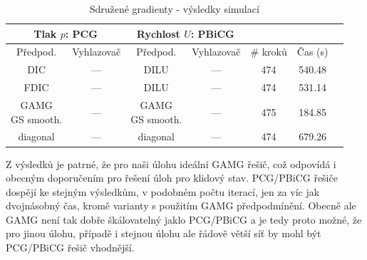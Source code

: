 \documentclass[a4paper,12pt]{report}
\theoremstyle{remark}
\begin{document}
\begin{table}[H]
\centering
\caption{Sdružené gradienty - výsledky simulací}
\renewcommand{\arraystretch}{1.9}
\begin{tabular}{*7c}
\toprule	
\multicolumn{2}{c}{Tlak $p$: \textbf{PCG}} & \multicolumn{2}{c}{Rychlost $U$: \textbf{PBiCG}}\\
	\midrule
	Předpod.&Vyhlazovač&Předpod.&Vyhlazovač&\# kroků&Čas (s)\\
	\midrule
	 DIC & --- &  DILU & --- &474&540.48\\
	FDIC & --- &  DILU & --- &474&531.14\\	
	 \shortstack{GAMG\\GS smooth.}& --- &  \shortstack{GAMG\\GS smooth.}& --- &475&184.85\\
	diagonal & --- & diagonal & ---&474&679.26\\	
	\bottomrule
\end{tabular}
\label{table:solvers_PCG}
\end{table}
Z výsledků je patrné, že pro naši úlohu ideální GAMG řešič, což odpovídá i obecným doporučením pro řešení úloh pro klidový stav. PCG/PBiCG řešiče dospějí ke stejným výsledkům, v podobném počtu iterací, jen za víc jak dvojnásobný čas, kromě varianty s použitím GAMG předpodmínění. Obecně ale GAMG není tak dobře škálovatelný jaklo PCG/PBiCG a je tedy proto možné, že pro jinou úlohu, případě i stejnou úlohu ale řádově větší síť by mohl být PCG/PBiCG řešič vhodnější.
\end{document}
